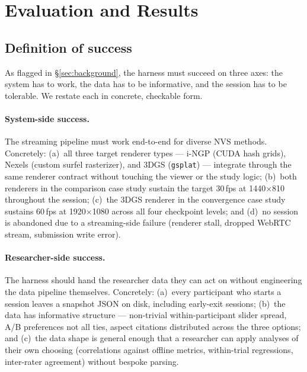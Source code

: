 
\section{Evaluation and Results}
\label{sec:results}

\subsection{Definition of success}
\label{sec:success}

As flagged in \S\ref{sec:background}, the harness must succeed on three
axes: the system has to work, the data has to be informative, and the
session has to be tolerable. We restate each in concrete, checkable form.

\paragraph{System-side success.}
The streaming pipeline must work end-to-end for diverse NVS methods.
Concretely: (a)~all three target renderer types --- i-NGP (CUDA hash
grids), Nexels (custom surfel rasterizer), and 3DGS (\texttt{gsplat})
--- integrate through the same renderer contract without touching the
viewer or the study logic; (b)~both renderers in the comparison case
study sustain the target 30\,fps at 1440$\times$810 throughout the
session; (c)~the 3DGS renderer in the convergence case study sustains
60\,fps at 1920$\times$1080 across all four checkpoint levels; and
(d)~no session is abandoned due to a streaming-side failure
(renderer stall, dropped WebRTC stream, submission write error).

\paragraph{Researcher-side success.}
The harness should hand the researcher data they can act on without
engineering the data pipeline themselves. Concretely: (a)~every
participant who starts a session leaves a snapshot JSON on disk,
including early-exit sessions; (b)~the data has informative structure
--- non-trivial within-participant slider spread, A/B preferences not
all ties, aspect citations distributed across the three options; and
(c)~the data shape is general enough that a researcher can apply
analyses of their own choosing (correlations against offline metrics,
within-trial regressions, inter-rater agreement) without bespoke
parsing.

